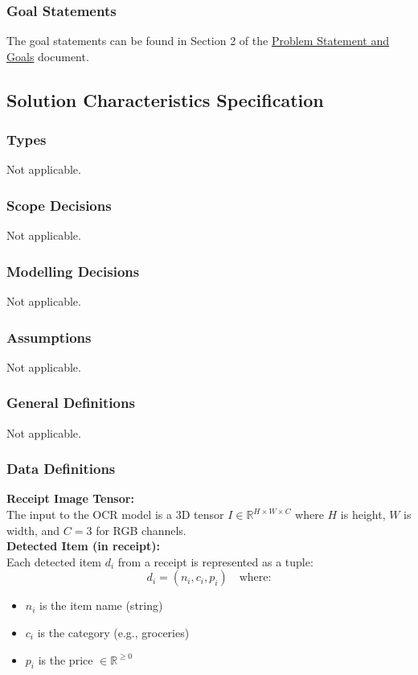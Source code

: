 \documentclass[12pt]{article}
\begin{document}
\subsubsection{Goal Statements}

The goal statements can be found in Section 2 of the
\href{https://github.com/PlutosCapstone/Plutos/blob/main/docs/ProblemStatementAndGoals/ProblemStatement.pdf}{Problem
Statement and Goals} document.

\newpage


\subsection{Solution Characteristics Specification}

\subsubsection{Types}
Not applicable.

\subsubsection{Scope Decisions}
Not applicable.

\subsubsection{Modelling Decisions}
Not applicable.

\subsubsection{Assumptions} \label{sec_assumpt} Not applicable.

\subsubsection{General Definitions}\label{sec_gendef} Not applicable.

\subsubsection{Data Definitions}\label{sec_datadef}

\textbf{Receipt Image Tensor:} \\
The input to the OCR model is a 3D tensor $I \in \mathbb{R}^{H \times W \times C}$ where $H$ is height, $W$ is width, and $C=3$ for RGB channels.\\
\textbf{Detected Item (in receipt): }\\
Each detected item $d_i$ from a receipt is represented as a tuple:
\[
d_i = (n_i, c_i, p_i) \quad \text{where:}
\]
\begin{itemize}
    \item $n_i$ is the item name (string)
    \item $c_i$ is the category (e.g., groceries)
    \item $p_i$ is the price $\in \mathbb{R}^{\geq 0}$
\end{itemize}
\end{document}
